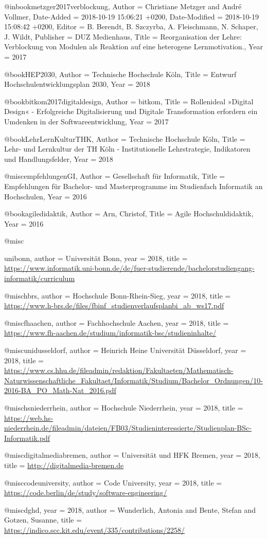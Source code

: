 @inbook{metzger2017verblockung,
	Author = {Christiane Metzger and Andr{\'e} Vollmer},
	Date-Added = {2018-10-19 15:06:21 +0200},
	Date-Modified = {2018-10-19 15:08:42 +0200},
	Editor = {B. Berendt, B. Szczyrba, A. Fleischmann, N. Schaper, J. Wildt},
	Publisher = {DUZ Medienhaus},
	Title = {Reorganisation der Lehre: Verblockung von Modulen als Reaktion auf eine heterogene Lernmotivation.},
	Year = {2017}}

@book{HEP2030,
	Author = {{Technische Hochschule K{\"o}ln}},
	Title = {Entwurf Hochschulentwicklungsplan 2030},
	Year = {2018}}

@book{bitkom2017digitaldesign,
	Author = {{bitkom}},
	Title = {Rollenideal »Digital Design« - Erfolgreiche Digitalisierung und Digitale Transformation erfordern ein Umdenken in der Softwareentwicklung},
	Year = {2017}}

@book{LehrLernKulturTHK,
	Author = {{Technische Hochschule K{\"o}ln}},
	Title = {Lehr- und Lernkultur der TH K{\"o}ln - Institutionelle Lehrstrategie, Indikatoren und Handlungsfelder},
	Year = {2018}}

@misc{empfehlungenGI,
		Author = {{Gesellschaft für Informatik}},
		Title = {Empfehlungen für Bachelor- und Masterprogramme im Studienfach Informatik an Hochschulen},
		Year = {2016}
}

@book{agiledidaktik,
		Author = {Arn, Christof},
		Title = {Agile Hochschuldidaktik},
		Year = {2016}
}

@misc{unibonn,
	author = {{Universität Bonn}},
  year = 2018,
	title = {\url{https://www.informatik.uni-bonn.de/de/fuer-studierende/bachelorstudiengang-informatik/curriculum}}
	
}

@misc{hbrs,
	author = {{Hochschule Bonn-Rhein-Sieg}},
	year = 2018,
	title = {\url{https://www.h-brs.de/files/fbinf_studienverlaufsplanbi_ab_ws17.pdf}}
}

@misc{fhaachen,
	author = {{Fachhochschule Aachen}},
	year = 2018,
	title = {\url{https://www.fh-aachen.de/studium/informatik-bsc/studieninhalte/}}
}

@misc{unidusseldorf,
	author = {{Heinrich Heine Universität Düsseldorf}},
	year = 2018,
	title = {\url{https://www.cs.hhu.de/fileadmin/redaktion/Fakultaeten/Mathematisch-Naturwissenschaftliche_Fakultaet/Informatik/Studium/Bachelor_Ordnungen/10-2016-BA_PO_Math-Nat_2016.pdf}}
}

@misc{hsniederrhein,
	author = {{Hochschule Niederrhein}},
	year = 2018,
	title = {\url{https://web.hs-niederrhein.de/fileadmin/dateien/FB03/Studieninteressierte/Studienplan-BSc-Informatik.pdf}}
}

@misc{digitalmediabremen,
	author = {{Universität und HFK Bremen}},
	year = 2018,
	title = {\url{http://digitalmedia-bremen.de}}
}

@misc{codeuniversity,
	author = {{Code University}},
	year = 2018,
	title = {\url{https://code.berlin/de/study/software-engineering/}}
}


@misc{dghd,
	year = 2018,
	author = {Wunderlich, Antonia and Bente, Stefan and Gotzen, Susanne},
	title = {\url{https://indico.scc.kit.edu/event/335/contributions/2258/}}
}
